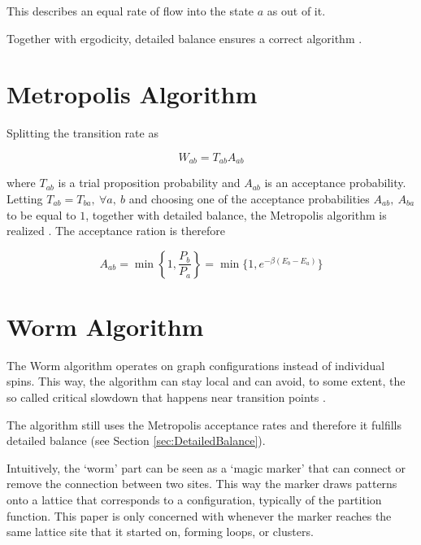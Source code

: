 This describes an equal rate of flow into the state $a$ as out of it.

Together with ergodicity, detailed balance ensures a correct algorithm \cite{Walter:IntroToMC}.


\section{Metropolis Algorithm}
\label{sec:MetropolisAlgorithm}

Splitting the transition rate as

\begin{equation}
    W_{ab} = T_{ab} A_{ab}
\end{equation}

where $T_{ab}$ is a trial proposition probability and $A_{ab}$ is an acceptance probability. Letting $T_{ab} = T_{ba}, \ \forall a, \ b$ and choosing one of the acceptance probabilities $A_{ab}, \ A_{ba}$ to be equal to $1$, together with detailed balance, the Metropolis algorithm is realized \cite{Walter:IntroToMC}. The acceptance ration is therefore

\begin{equation}
    A_{ab} = \min \left \{ 1, \frac{P_b}{P_a} \right \} = \min \{ 1, e^{-\beta(E_b - E_a )} \}
\end{equation}


\section{Worm Algorithm}
\label{sec:WormAlgorithm}


The Worm algorithm operates on graph configurations instead of individual spins. This way, the algorithm can stay local and can avoid, to some extent, the so called critical slowdown that happens near transition points \cite{Prokofev:first_worm_algorithm}.

The algorithm still uses the Metropolis acceptance rates and therefore it fulfills detailed balance (see Section \ref{sec:DetailedBalance}).

Intuitively, the `worm' part can be seen as a `magic marker' that can connect or remove the connection between two sites. This way the marker draws patterns onto a lattice that corresponds to a configuration, typically of the partition function. This paper is only concerned with whenever the marker reaches the same lattice site that it started on, forming loops, or clusters.

